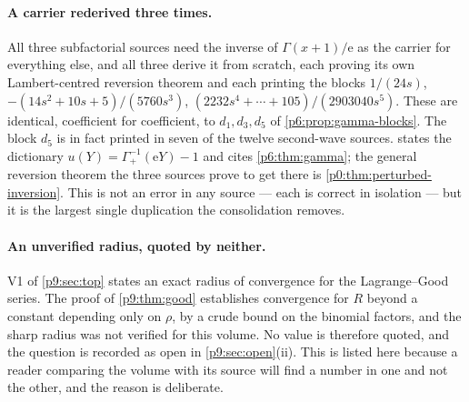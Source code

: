 \documentclass[11pt,a4paper,oneside]{book}
\theoremstyle{plain}
\theoremstyle{definition}
\theoremstyle{remark}
\newcommand{\e}{\mathrm{e}}
\begin{document}
\paragraph{A carrier rederived three times.}
All three subfactorial sources need the inverse of \(\Gamma(x+1)/\e\) as the
carrier for everything else, and all three derive it from scratch, each
proving its own Lambert-centred reversion theorem and each printing the
blocks \(1/(24s)\), \(-(14s^{2}+10s+5)/(5760s^{3})\),
\((2232s^{4}+\cdots+105)/(2903040s^{5})\).  These are identical, coefficient
for coefficient, to \(d_1,d_3,d_5\) of \cref{p6:prop:gamma-blocks}.  The
block \(d_5\) is in fact printed in seven of the twelve second-wave sources.
 states the dictionary
\(u(Y)=\Gamma_+^{-1}(\e Y)-1\) and cites \cref{p6:thm:gamma}; the general
reversion theorem the three sources prove to get there is
\cref{p0:thm:perturbed-inversion}.  This is not an error in any source --- each
is correct in isolation --- but it is the largest single duplication the
consolidation removes.

\paragraph{An unverified radius, quoted by neither.}
\textsf{V1} of \cref{p9:sec:top} states an exact radius of convergence for the
Lagrange--Good series.  The proof of \cref{p9:thm:good} establishes
convergence for \(R\) beyond a constant depending only on \(\rho\), by a crude
bound on the binomial factors, and the sharp radius was not verified for this
volume.  No value is therefore quoted, and the question is recorded as open in
\cref{p9:sec:open}(ii).  This is listed here because a reader comparing the
volume with its source will find a number in one and not the other, and the
reason is deliberate.
\end{document}
